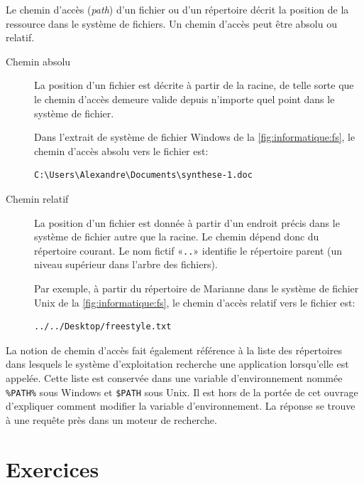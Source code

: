 Le chemin d'accès (\emph{path}) d'un fichier ou
d'un répertoire décrit la position de la ressource dans le système de
fichiers. Un chemin d'accès peut être absolu ou relatif.
\begin{description}
\item[Chemin absolu]  La position d'un
  fichier est décrite à partir de la racine, de telle sorte que le
  chemin d'accès demeure valide depuis n'importe quel point dans le
  système de fichier.

  Dans l'extrait de système de fichier Windows de la
  \autoref{fig:informatique:fs}, le chemin d'accès absolu vers le
  fichier  est:
\begin{Schunk}
\begin{Verbatim}
C:\Users\Alexandre\Documents\synthese-1.doc
\end{Verbatim}
\end{Schunk}
\item[Chemin relatif]  La position d'un
  fichier est donnée à partir d'un endroit précis dans le système de
  fichier autre que la racine. Le chemin dépend donc du répertoire
  courant. Le nom fictif «\verb=..=» identifie le répertoire parent
  (un niveau supérieur dans l'arbre des fichiers).

  Par exemple, à partir du répertoire  de
  Marianne dans le système de fichier Unix de la
  \autoref{fig:informatique:fs}, le chemin d'accès relatif vers le
  fichier  est:
\begin{Schunk}
\begin{Verbatim}
../../Desktop/freestyle.txt
\end{Verbatim}
\end{Schunk}
\end{description}

La notion de chemin d'accès fait également référence à la liste des
répertoires dans lesquels le système d'exploitation recherche une
application lorsqu'elle est appelée. Cette liste est conservée dans
une variable d'environnement nommée \verb=%PATH%= sous Windows
et \verb=$PATH= sous Unix. Il est hors de la portée de cet
ouvrage d'expliquer comment modifier la variable d'environnement. La
réponse se trouve à une requête près dans un moteur de recherche.


\section{Exercices}
\label{operateurs:exercices}

